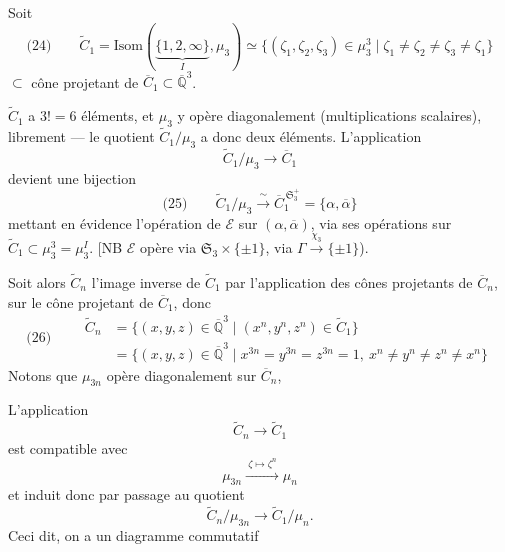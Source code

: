 \documentclass[11pt,a4paper]{article}
\begin{document}

Soit 
\[
  \text{(24)} \qquad \widetilde{C}_1 = \mathrm{Isom}(\underbrace{\{1, 2, \infty\}}_{I}, \mu_3) \simeq \{(\zeta_1, \zeta_2, \zeta_3) \in \mu_3^{3} \mid \zeta_1 \neq \zeta_2 \neq \zeta_3 \neq \zeta_1\}
\]
$\subset$ \struck{\ill{}} cône projetant de $\overline{C}_1 \subset \overline{\mathbb{Q}}^{3}$.

$\widetilde{C}_1$ a $3! = 6$ éléments, et $\mu_3$ y opère diagonalement (multiplications scalaires),  librement --- le quotient $\widetilde{C}_1/\mu_3$ a donc deux éléments. L'application
\[
  \widetilde{C}_1/\mu_3 \longrightarrow \overline{C}_1
\]
devient une bijection
\[
  \text{(25)} \qquad \widetilde{C}_1/\mu_3 \xrightarrow{\ \sim\ } \overline{C}_1^{\,\mathfrak{S}_3^{+}} = \{\alpha, \overline{\alpha}\}
\]
mettant en évidence l'opération de $\mathcal{E}$ sur $(\alpha, \overline{\alpha})$, via ses opérations sur $\widetilde{C}_1 \subset \mu_3^{3} = \mu_3^{I}$. [NB $\mathcal{E}$ opère via $\mathfrak{S}_3 \times \{\pm 1\}$, via $\Gamma \xrightarrow{\chi_3} \{\pm 1\}$).

Soit alors $\widetilde{C}_n$ l'image inverse de $\widetilde{C}_1$ par l'application  des cônes projetants de $\overline{C}_n$, sur le cône projetant de $\overline{C}_1$, donc 
\[
  \text{(26)} \qquad
  \begin{aligned}
    \widetilde{C}_n &= \{(x, y, z) \in \overline{\mathbb{Q}}^{3} \mid (x^{n}, y^{n}, z^{n}) \in \widetilde{C}_1\} \\
    &= \{(x, y, z) \in \overline{\mathbb{Q}}^{3} \mid x^{3n} = y^{3n} = z^{3n} = 1,\ x^{n} \neq y^{n} \neq z^{n} \neq x^{n}\}
  \end{aligned}
\]
Notons que $\mu_{3n}$ opère diagonalement sur $\overline{C}_n$,

L'application
\[
  \widetilde{C}_n \longrightarrow \widetilde{C}_1
\]
est compatible avec
\[
  \mu_{3n} \xrightarrow{\ \zeta \mapsto \zeta^{n}\ } \mu_n
\]
et induit donc par passage au quotient
\[
  \widetilde{C}_n/\mu_{3n} \longrightarrow \widetilde{C}_1/\mu_n .
\]
Ceci dit, on a un diagramme commutatif
\end{document}
